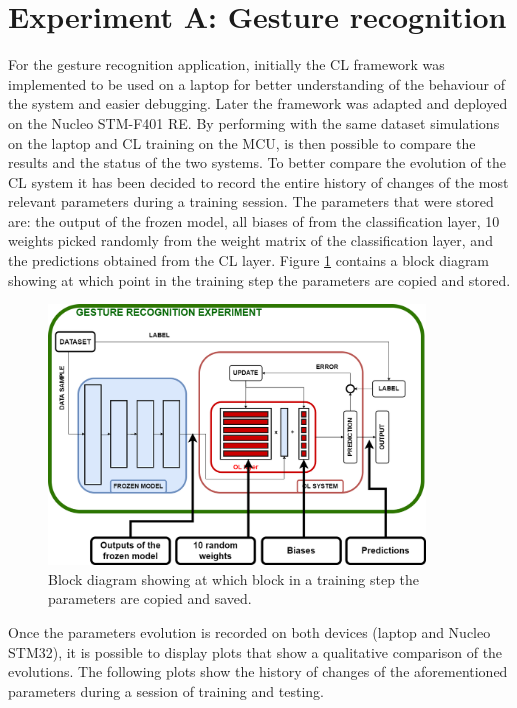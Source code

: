 \documentclass[12pt]{report}
\begin{document}
\section{Experiment A: Gesture recognition}
For the gesture recognition application, initially the CL framework was implemented to be used on a laptop for better understanding of the behaviour of the system and easier debugging. Later the framework was adapted and deployed on the Nucleo STM-F401 RE. By performing with the same dataset simulations on the laptop and CL training on the MCU, is then possible to compare the results and the status of the two systems. To better compare the evolution of the CL system it has been decided to record the entire history of changes of the most relevant parameters during a training session. The parameters that were stored are: the output of the frozen model, all biases of from the classification layer, 10 weights picked randomly from the weight matrix of the classification layer, and the predictions obtained from the CL layer. Figure \ref{fig:evolution_params} contains a block diagram showing at which point in the training step the parameters are copied and stored. \\

\begin{figure}[h!]
    \centering
    \includegraphics[width=100mm]{Figures/Chapter5/evolution.png} 
    \caption{Block diagram showing at which block in a training step the parameters are copied and saved.}
    \label{fig:evolution_params}    
\end{figure}

Once the parameters evolution is recorded on both devices (laptop and Nucleo STM32), it is possible to display plots that show a qualitative comparison of the evolutions. The following plots show the history of changes of the aforementioned parameters during a session of training and testing.
\end{document}
